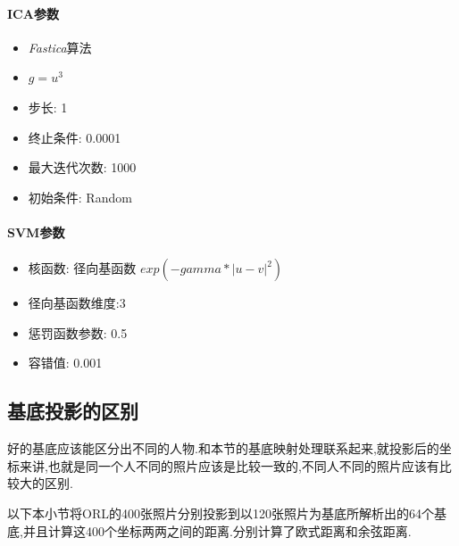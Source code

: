 	\paragraph{ICA参数}
	\begin{itemize}
		\item \textit{Fastica}算法
		\item $g = u^3$
		\item 步长: 1
		\item 终止条件: 0.0001
		\item 最大迭代次数: 1000
		\item 初始条件: Random
	\end{itemize}

	
	\paragraph{SVM参数}
	\begin{itemize}
		\item 核函数: 径向基函数 $exp(-gamma*|u-v|^2)$
		\item 径向基函数维度:3
		\item 惩罚函数参数: 0.5
		\item 容错值: 0.001
	\end{itemize}
	
\subsection{基底投影的区别}
\label{sec:pnibase}
好的基底应该能区分出不同的人物.和本节的基底映射处理联系起来,就投影后的坐标来讲,也就是同一个人不同的照片应该是比较一致的,不同人不同的照片应该有比较大的区别.\newline

以下本小节将ORL的400张照片分别投影到以120张照片为基底所解析出的64个基底,并且计算这400个坐标两两之间的距离.分别计算了欧式距离和余弦距离.


